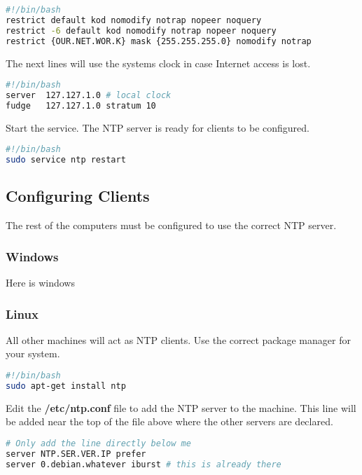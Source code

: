 \documentclass{article}
\begin{document}
\begin{lstlisting}[language=bash]
#!/bin/bash
restrict default kod nomodify notrap nopeer noquery
restrict -6 default kod nomodify notrap nopeer noquery
restrict {OUR.NET.WOR.K} mask {255.255.255.0} nomodify notrap
\end{lstlisting}

The next lines will use the systems clock in case Internet access is lost.

\begin{lstlisting}[language=bash]
#!/bin/bash
server  127.127.1.0 # local clock
fudge   127.127.1.0 stratum 10
\end{lstlisting}

Start the service. The NTP server is ready for clients to be configured.

\begin{lstlisting}[language=bash]
#!/bin/bash
sudo service ntp restart
\end{lstlisting}


\subsection{Configuring Clients}
The rest of the computers must be configured to use the correct NTP server.

\subsubsection{Windows}
Here is windows

\subsubsection{Linux}
All other machines will act as NTP clients. Use the correct package manager for your system.

\begin{lstlisting}[language=bash]
#!/bin/bash
sudo apt-get install ntp
\end{lstlisting}

Edit the \textbf{/etc/ntp.conf} file to add the NTP server to the machine. This line will be added near the top of the file above where the other servers are declared.

\begin{lstlisting}[language=bash]
# Only add the line directly below me
server NTP.SER.VER.IP prefer
server 0.debian.whatever iburst # this is already there
\end{lstlisting}
\end{document}
